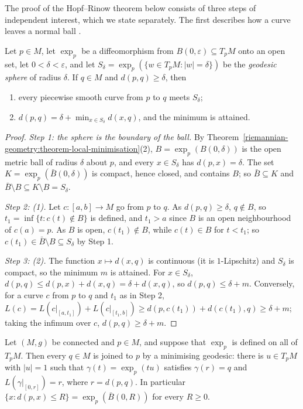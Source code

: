 The proof of the Hopf--Rinow theorem below consists of three steps of independent interest, which we state separately. The first describes how a curve leaves a normal ball
\cite[2.104]{gallot-hulin-lafontaine}.

\begin{lemma}\label{riemannian-geometry:lemma-geodesic-sphere}
Let $p \in M$, let $\exp_p$ be a diffeomorphism from $B(0, \varepsilon) \subseteq T_pM$ onto an open set, let $0 < \delta < \varepsilon$, and let
$S_\delta = \exp_p(\{w \in T_pM : |w| = \delta\})$ be the \emph{geodesic sphere} of radius $\delta$. If $q \in M$ and $d(p, q) \geq \delta$, then
\begin{enumerate}
\item every piecewise smooth curve from $p$ to $q$ meets $S_\delta$;
\item $d(p, q) = \delta + \min_{x \in S_\delta} d(x, q)$, and the minimum is attained.
\end{enumerate}
\end{lemma}

\begin{proof}
\emph{Step 1: the sphere is the boundary of the ball.} By Theorem~\ref{riemannian-geometry:theorem-local-minimisation}(2), $B = \exp_p(B(0, \delta))$ is the open metric ball of radius $\delta$
about $p$, and every $x \in S_\delta$ has $d(p, x) = \delta$. The set $K = \exp_p(\bar B(0, \delta))$ is compact, hence closed, and contains $B$; so $\bar B \subseteq K$ and $\bar B \setminus B \subseteq K \setminus B = S_\delta$.

\emph{Step 2: (1).} Let $c \colon [a, b] \to M$ go from $p$ to $q$. As $d(p, q) \geq \delta$, $q \notin B$, so $t_1 = \inf\{t : c(t) \notin B\}$ is defined, and $t_1 > a$ since $B$ is an open neighbourhood of $c(a) = p$. As $B$ is open,
$c(t_1) \notin B$, while $c(t) \in B$ for $t < t_1$; so $c(t_1) \in \bar B \setminus B \subseteq S_\delta$ by Step 1.

\emph{Step 3: (2).} The function $x \mapsto d(x, q)$ is continuous (it is $1$-Lipschitz) and $S_\delta$ is compact, so the minimum $m$ is attained. For $x \in S_\delta$, $d(p, q) \leq d(p, x) + d(x, q) = \delta + d(x, q)$, so
$d(p, q) \leq \delta + m$. Conversely, for a curve $c$ from $p$ to $q$ and $t_1$ as in Step 2, $L(c) = L(c|_{[a, t_1]}) + L(c|_{[t_1, b]}) \geq d(p, c(t_1)) + d(c(t_1), q) \geq \delta + m$; taking the infimum over $c$, $d(p, q) \geq \delta + m$.
\end{proof}

\begin{proposition}\label{riemannian-geometry:proposition-minimising-from-point}
Let $(M, g)$ be connected and $p \in M$, and suppose that $\exp_p$ is defined on all of $T_pM$. Then every $q \in M$ is joined to $p$ by a minimising geodesic: there is $u \in T_pM$ with $|u| = 1$ such that
$\gamma(t) = \exp_p(tu)$ satisfies $\gamma(r) = q$ and $L(\gamma|_{[0, r]}) = r$, where $r = d(p, q)$. In particular $\{x : d(p, x) \leq R\} = \exp_p(\bar B(0, R))$ for every $R \geq 0$.
\end{proposition}

